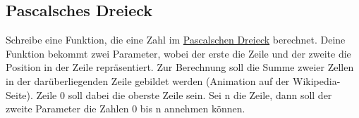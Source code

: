 \subsection{Pascalsches Dreieck }
Schreibe eine Funktion, die eine Zahl im \href{https://de.wikipedia.org/wiki/Pascalsches_Dreieck}{Pascalschen Dreieck}
berechnet. Deine Funktion bekommt zwei Parameter, wobei der erste die Zeile und
der zweite die Position in der Zeile repräsentiert. Zur Berechnung soll die
Summe zweier Zellen in der darüberliegenden Zeile gebildet werden (Animation
auf der Wikipedia-Seite). Zeile 0 soll dabei die oberste Zeile sein. Sei n die
Zeile, dann soll der zweite Parameter die Zahlen 0 bis n annehmen können.

